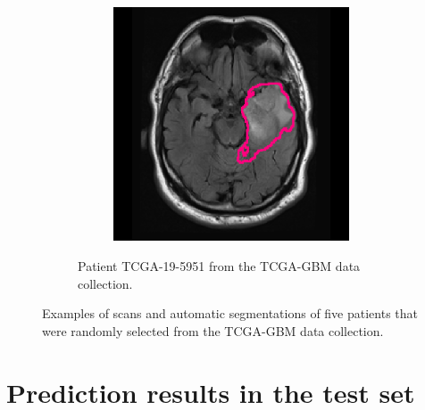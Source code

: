 \begin{subappendices}
\begin{figure}[htbp]
\begin{subfigure}[b]{0.95\textwidth}
\begin{subfigure}[b]{0.215\textwidth}
        \end{subfigure}
        \hfill
        \begin{subfigure}[b]{0.215\textwidth}
        \includegraphics[width=\textwidth, clip, trim=2.5cm 0.5cm 2.5cm 0.5cm]{Figures/Random_segs/FLAIR_TCGA-19-5951.png}
        \end{subfigure}
        \caption{Patient TCGA-19-5951 from the TCGA-GBM data collection.}
    \end{subfigure}
    \caption{Examples of scans and automatic segmentations of five patients that were randomly selected from the TCGA-GBM data collection.}\label{fig:seg_examples_HGG}
\end{figure}



\clearpage
\newpage

\section{Prediction results in the test set}\label{app:individual_pred}
\underline{}

\newpage




\end{subappendices}
